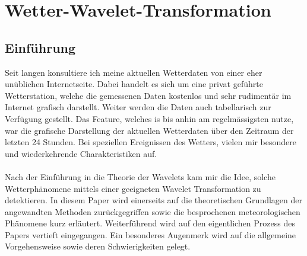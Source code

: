 %
%
%
\chapter{Wetter-Wavelet-Transformation\label{chapter:wwt}}
\begin{refsection}




\lstset{style=mystyle}


\section{Einführung}


Seit langen konsultiere ich meine aktuellen Wetterdaten von einer eher unüblichen Internetseite.
Dabei handelt es sich um eine privat geführte Wetterstation, welche die gemessenen Daten kostenlos und sehr rudimentär im Internet grafisch darstellt.
Weiter werden die Daten auch tabellarisch zur Verfügung gestellt.
Das Feature, welches is bis anhin am regelmässigsten nutze, war die grafische Darstellung der aktuellen Wetterdaten über den Zeitraum der letzten 24 Stunden.
Bei speziellen Ereignissen des Wetters, vielen mir besondere und wiederkehrende Charakteristiken auf.
\\
\\
Nach der Einführung in die Theorie der Wavelets kam mir die Idee, solche Wetterphänomene mittels einer geeigneten Wavelet Transformation zu detektieren.
In diesem Paper wird einerseits auf die theoretischen Grundlagen der angewandten Methoden zurückgegriffen sowie die besprochenen meteorologischen Phänomene kurz erläutert. 
Weiterführend wird auf den eigentlichen Prozess des Papers vertieft eingegangen.
Ein besonderes Augenmerk wird auf die allgemeine Vorgehensweise sowie deren Schwierigkeiten gelegt.
\\





\end{refsection}
